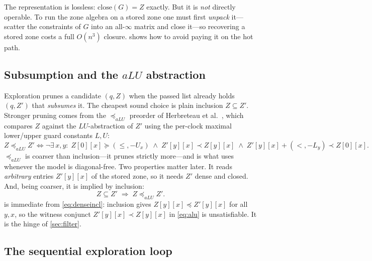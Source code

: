 The representation is lossless: $\mathrm{close}(G) = Z$ exactly.  But it is
\emph{not} directly operable.  To run the zone algebra on a stored zone one must
first \emph{unpack} it---scatter the constraints of $G$ into an all-$\infty$
matrix and close it---so recovering a stored zone costs a full $O(n^3)$ closure.
 shows how to avoid paying it on the hot path.

\subsection{Subsumption and the \texorpdfstring{$aLU$}{aLU} abstraction}

Exploration prunes a candidate $(q,Z)$ when the passed list already holds
$(q,Z')$ that \emph{subsumes} it.  The cheapest sound choice is plain inclusion
$Z \subseteq Z'$.  Stronger pruning comes from the $\preceq_{aLU}$ preorder of
Herbreteau et al.~\cite{Herbreteau12}, which compares $Z$ against the
$LU$-abstraction of $Z'$ using the per-clock maximal lower/upper guard constants
$L, U$:
\begin{equation}\label{eq:alu}
  Z \preceq_{aLU} Z' \iff \neg\exists\, x,y:\;
     Z[0][x] \succeq (\leq, -U_x) \;\wedge\;
     Z'[y][x] \prec Z[y][x] \;\wedge\;
     Z'[y][x] + (<, -L_y) \prec Z[0][x].
\end{equation}
$\preceq_{aLU}$ is coarser than inclusion---it prunes strictly more---and is what
\tool{} uses whenever the model is diagonal-free.  Two properties matter later.
It reads \emph{arbitrary} entries $Z'[y][x]$ of the stored zone, so it needs $Z'$
dense and closed.  And, being coarser, it is implied by inclusion:
\begin{equation}\label{eq:incl-implies-alu}
  Z \subseteq Z' \;\Longrightarrow\; Z \preceq_{aLU} Z' .
\end{equation}
 is immediate from \cref{eq:denseincl}: inclusion gives
$Z[y][x] \preceq Z'[y][x]$ for all $y,x$, so the witness conjunct $Z'[y][x] \prec
Z[y][x]$ in \cref{eq:alu} is unsatisfiable.  It is the hinge of
\cref{sec:filter}.

\subsection{The sequential exploration loop}

